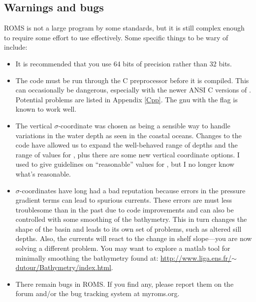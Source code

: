 \subsection{Warnings and bugs}
ROMS is not a large program by some standards, but it is still complex
enough to require some effort to use effectively.
Some specific things to be wary of include:
\begin{itemize}
  \item It is recommended that you use 64 bits of precision rather
than 32 bits.
  \item The code must be run through the C preprocessor before it
is compiled.  This can occasionally be dangerous, especially with
the newer ANSI C versions of .  Potential problems are listed
in Appendix \ref{Cpp}. The gnu  with the  flag
is known to work well.
  \item The vertical $\sigma$-coordinate was chosen as being a sensible
way to handle variations in the water depth as seen in the coastal
oceans. Changes to the code have allowed us to expand the well-behaved
range of depths and the range of values for , plus there
are some new vertical coordinate options. I used to give guidelines on
``reasonable'' values for , but I no longer know
what's reasonable.
  \item $\sigma$-coordinates have long had a bad reputation
because errors in the pressure gradient terms can lead to spurious
currents. These errors are must less troublesome than in the past due
to code improvements and can also be controlled with some smoothing
of the bathymetry. This in turn changes the shape of the basin and
leads to its own set of problems, such as altered sill depths. Also, the
currents will react to the change in shelf slope---you are now solving a
different problem. You may want to explore a matlab tool for minimally
smoothing the bathymetry found at:
\href{http://www.liga.ens.fr/~dutour/Bathymetry/index.html}{http://www.liga.ens.fr/$\sim$dutour/Bathymetry/index.html}.
  \item There remain bugs in ROMS. If you find any, please report
them on the forum and/or the bug tracking system at myroms.org.
\end{itemize}

